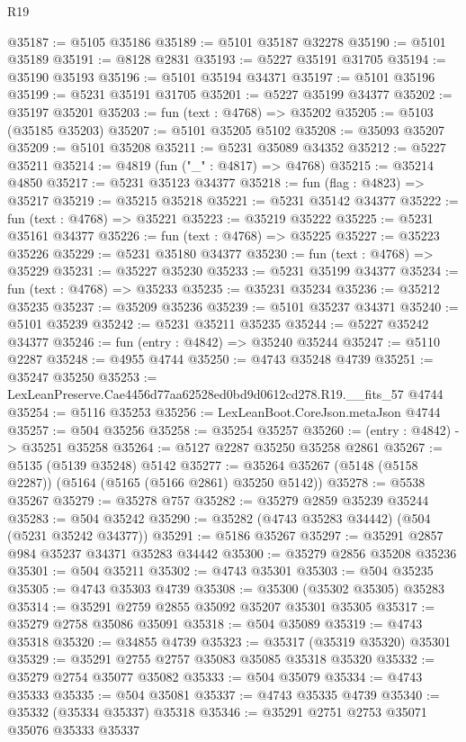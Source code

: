 \begin{lexlean}{R19}
\begin{coremodule}
{{{{{{{{{{{@35187 := @5105 @35186
@35189 := @5101 @35187 @32278
@35190 := @5101 @35189
@35191 := @8128 @2831
@35193 := @5227 @35191 @31705
@35194 := @35190 @35193
@35196 := @5101 @35194 @34371
@35197 := @5101 @35196
@35199 := @5231 @35191 @31705
@35201 := @5227 @35199 @34377
@35202 := @35197 @35201
@35203 := fun (text : @4768) => @35202
@35205 := @5103 (@35185 @35203)
@35207 := @5101 @35205 @5102
@35208 := @35093 @35207
@35209 := @5101 @35208
@35211 := @5231 @35089 @34352
@35212 := @5227 @35211
@35214 := @4819 (fun ("_" : @4817) => @4768)
@35215 := @35214 @4850
@35217 := @5231 @35123 @34377
@35218 := fun (flag : @4823) => @35217
@35219 := @35215 @35218
@35221 := @5231 @35142 @34377
@35222 := fun (text : @4768) => @35221
@35223 := @35219 @35222
@35225 := @5231 @35161 @34377
@35226 := fun (text : @4768) => @35225
@35227 := @35223 @35226
@35229 := @5231 @35180 @34377
@35230 := fun (text : @4768) => @35229
@35231 := @35227 @35230
@35233 := @5231 @35199 @34377
@35234 := fun (text : @4768) => @35233
@35235 := @35231 @35234
@35236 := @35212 @35235
@35237 := @35209 @35236
@35239 := @5101 @35237 @34371
@35240 := @5101 @35239
@35242 := @5231 @35211 @35235
@35244 := @5227 @35242 @34377
@35246 := fun (entry : @4842) => @35240 @35244
@35247 := @5110 @2287
@35248 := @4955 @4744
@35250 := @4743 @35248 @4739
@35251 := @35247 @35250
@35253 := LexLeanPreserve.Cae4456d77aa62528ed0bd9d0612cd278.R19.__fits_57 @4744
@35254 := @5116 @35253
@35256 := LexLeanBoot.CoreJson.metaJson @4744
@35257 := @504 @35256
@35258 := @35254 @35257
@35260 := (entry : @4842) -> @35251 @35258
@35264 := @5127 @2287 @35250 @35258 @2861
@35267 := @5135 (@5139 @35248) @5142
@35277 := @35264 @35267 (@5148 (@5158 @2287)) (@5164 (@5165 (@5166 @2861) @35250 @5142))
@35278 := @5538 @35267
@35279 := @35278 @757
@35282 := @35279 @2859 @35239 @35244
@35283 := @504 @35242
@35290 := @35282 (@4743 @35283 @34442) (@504 (@5231 @35242 @34377))
@35291 := @5186 @35267
@35297 := @35291 @2857 @984 @35237 @34371 @35283 @34442
@35300 := @35279 @2856 @35208 @35236
@35301 := @504 @35211
@35302 := @4743 @35301
@35303 := @504 @35235
@35305 := @4743 @35303 @4739
@35308 := @35300 (@35302 @35305) @35283
@35314 := @35291 @2759 @2855 @35092 @35207 @35301 @35305
@35317 := @35279 @2758 @35086 @35091
@35318 := @504 @35089
@35319 := @4743 @35318
@35320 := @34855 @4739
@35323 := @35317 (@35319 @35320) @35301
@35329 := @35291 @2755 @2757 @35083 @35085 @35318 @35320
@35332 := @35279 @2754 @35077 @35082
@35333 := @504 @35079
@35334 := @4743 @35333
@35335 := @504 @35081
@35337 := @4743 @35335 @4739
@35340 := @35332 (@35334 @35337) @35318
@35346 := @35291 @2751 @2753 @35071 @35076 @35333 @35337
}}}}}}}}}}}
\end{coremodule}
\end{lexlean}
